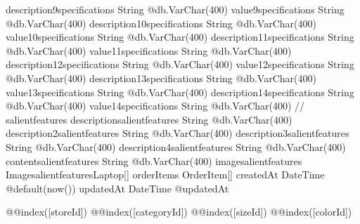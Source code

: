{  description9specifications  String                       @db.VarChar(400)
  value9specifications        String                       @db.VarChar(400)
  description10specifications String                       @db.VarChar(400)
  value10specifications       String                       @db.VarChar(400)
  description11specifications String                       @db.VarChar(400)
  value11specifications       String                       @db.VarChar(400)
  description12specifications String                       @db.VarChar(400)
  value12specifications       String                       @db.VarChar(400)
  description13specifications String                       @db.VarChar(400)
  value13specifications       String                       @db.VarChar(400)
  description14specifications String                       @db.VarChar(400)
  value14specifications       String                       @db.VarChar(400)
  // salientfeatures
  descriptionsalientfeatures  String                       @db.VarChar(400)
  description2salientfeatures String                       @db.VarChar(400)
  description3salientfeatures String                       @db.VarChar(400)
  description4salientfeatures String                       @db.VarChar(400)
  contentsalientfeatures      String                       @db.VarChar(400)
  imagesalientfeatures  ImagesalientfeaturesLaptop[]
  orderItems                  OrderItem[]
  createdAt                   DateTime                     @default(now())
  updatedAt                   DateTime                     @updatedAt

  @@index([storeId])
  @@index([categoryId])
  @@index([sizeId])
  @@index([colorId])
}


